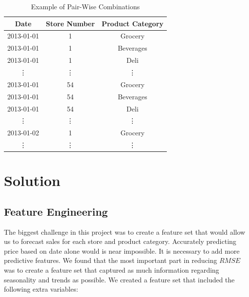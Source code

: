 \documentclass[12pt]{article}
\begin{document}
\begin{table}[H]
\centering
\begin{tabular}{|c|c|c|}
\hline
\textbf{Date} & \textbf{Store Number} & \textbf{Product Category} \\ \hline
2013-01-01 & 1 & Grocery \\ \hline
2013-01-01 & 1 & Beverages \\ \hline
2013-01-01 & 1 & Deli \\ \hline
\vdots & \vdots & \vdots \\ \hline
2013-01-01 & 54 & Grocery \\ \hline
2013-01-01 & 54 & Beverages \\ \hline
2013-01-01 & 54 & Deli \\ \hline
\vdots & \vdots & \vdots \\ \hline
2013-01-02 & 1 & Grocery \\ \hline
\vdots & \vdots & \vdots \\ \hline
\end{tabular}
\caption{Example of Pair-Wise Combinations}
\end{table}
\section{Solution}
\subsection{Feature Engineering}
The biggest challenge in this project was to create a feature set that would allow us to forecast sales for each store and product category.
Accurately predicting price based on date alone would is near impossible.
It is necessary to add more predictive features.
We found that the most important part in reducing $RMSE$ was to create a feature set that captured as much information regarding seasonality and trends as possible.
We created a feature set that included the following extra variables:
\end{document}
